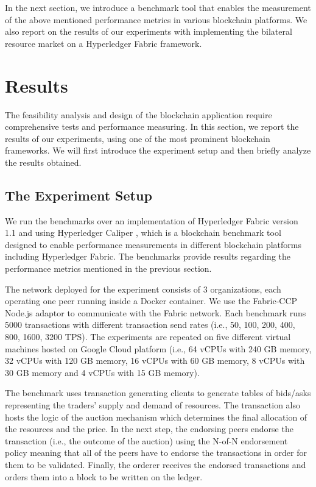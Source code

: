 \documentclass[conference]{IEEEtran}
\begin{document}
In the next section, we introduce a benchmark tool that enables the measurement of the above mentioned performance metrics in various blockchain platforms. We also report on the results of our experiments with implementing the bilateral resource market on a Hyperledger Fabric framework.




\section{Results}

The feasibility analysis and design of the blockchain application require comprehensive tests and performance measuring. In this section, we report the results of our experiments, using one of the most prominent blockchain frameworks. We will first introduce the experiment setup and then briefly analyze the results obtained.

\subsection{The Experiment Setup}
We run the benchmarks over an implementation of Hyperledger Fabric version 1.1 and using Hyperledger Caliper \cite{caliper}, which is a blockchain benchmark tool designed to enable performance measurements in different blockchain platforms including Hyperledger Fabric. The benchmarks provide results regarding the performance metrics mentioned in the previous section.

The network deployed for the experiment consists of 3 organizations, each operating one peer running inside a Docker container. We use the Fabric-CCP Node.js adaptor to communicate with the Fabric network. Each benchmark runs 5000 transactions with different transaction send rates (i.e., 50, 100, 200, 400, 800, 1600, 3200 TPS). The experiments are repeated on five different virtual machines hosted on Google Cloud platform (i.e., 64 vCPUs with 240 GB memory, 32 vCPUs with 120 GB memory, 16 vCPUs with 60 GB memory, 8 vCPUs with 30 GB memory and 4 vCPUs with 15 GB memory).

The benchmark uses transaction generating clients to generate tables of bids/asks representing the traders' supply and demand of resources. The transaction also hosts the logic of the auction mechanism which determines the final allocation of the resources and the price. In the next step, the endorsing peers endorse the transaction (i.e., the outcome of the auction) using the N-of-N endorsement policy meaning that all of the peers have to endorse the transactions in order for them to be validated. Finally, the orderer receives the endorsed transactions and orders them into a block to be written on the ledger.
\end{document}
